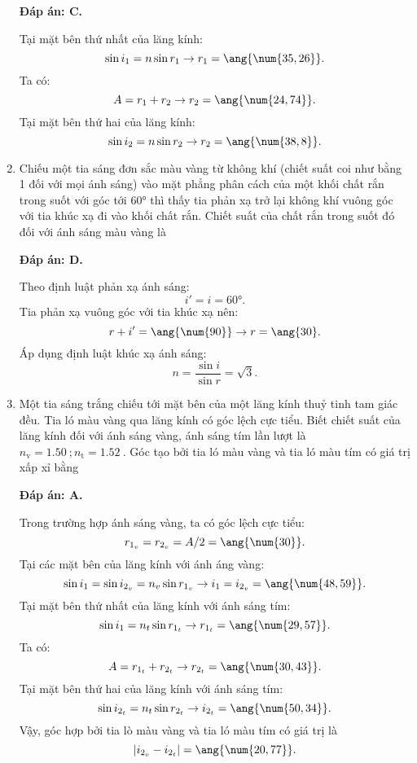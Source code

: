\begin{enumerate}[label=\bfseries Câu \arabic*:]
	\loigiai
	{		\textbf{Đáp án: C.}
		
Tại mặt bên thứ nhất của lăng kính:
$$
	\sin i_{1} = n \sin r_{1} \rightarrow r_{1} = \ang{\num{35,26}}.
$$
Ta có:
$$
	A = r_{1} + r_{2} \rightarrow r_{2} = \ang{\num{24,74}}.
$$
Tại mặt bên thứ hai của lăng kính:
$$
	\sin i_{2} = n \sin r_{2} \rightarrow r_{2} = \ang{\num{38,8}}.
$$
	}
	
	\item {} 
		\cauhoi
	{Chiếu một tia sáng đơn sắc màu vàng từ không khí (chiết suất coi như bằng 1 đối với mọi ánh sáng) vào mặt phẳng phân cách của một khối chất rắn trong suốt với góc tới $\ang{60}$ thì thấy tia phản xạ trở lại không khí vuông góc với tia khúc xạ đi vào khối chất rắn. Chiết suất của chất rắn trong suốt đó đối với ánh sáng màu vàng là
	}
	
	\loigiai
	{		\textbf{Đáp án: D.}
		

Theo định luật phản xạ ánh sáng:
$$
	i' = i = \ang{60}.
$$
Tia phản xạ vuông góc với tia khúc xạ nên: 
$$
	r + i' = \ang{\num{90}} \rightarrow r = \ang{30}.
$$
Áp dụng định luật khúc xạ ánh sáng:
$$
	n = \dfrac{\sin i}{\sin r} = \sqrt{3}.
$$
	}
	
	\item {}
		\cauhoi
	{Một tia sáng trắng chiếu tới mặt bên của một lăng kính thuỷ tinh tam giác đều. Tia ló màu vàng qua lăng kính có góc lệch cực tiểu. Biết chiết suất của lăng kính đối với ánh sáng vàng, ánh sáng tím lần lượt là $n_\text{v} = \SI{1.50}{}; n_\text{t}=\SI{1.52}{}$. Góc tạo bởi tia ló màu vàng và tia ló màu tím có giá trị xấp xỉ bằng
	}
	
	\loigiai
	{		\textbf{Đáp án: A.}
		
Trong trường hợp ánh sáng vàng, ta có góc lệch cực tiểu:
$$
	r_{1_v} = r_{2_v} = A/2 = \ang{\num{30}}.
$$
Tại các mặt bên của lăng kính với ánh áng vàng:
$$
	\sin i_{1} = \sin i_{2_v} = n_{v} \sin r_{1_v} \rightarrow i_{1} = i_{2_v} = \ang{\num{48,59}}.
$$
Tại mặt bên thứ nhất của lăng kính với ánh sáng tím:
$$
	\sin i_{1} = n_{t} \sin r_{1_t} \rightarrow r_{1_t} = \ang{\num{29,57}}.
$$
Ta có:
$$
	A = r_{1_t} + r_{2_t} \rightarrow r_{2_t} = \ang{\num{30,43}}.
$$
Tại mặt bên thứ hai của lăng kính với ánh sáng tím:
$$
	\sin i_{2_t} = n_{t} \sin r_{2_t} \rightarrow i_{2_t} = \ang{\num{50,34}}.
$$
Vậy, góc hợp bởi tia lò màu vàng và tia ló màu tím có giá trị là
$$
	| i_{2_v} - i_{2_t} | = \ang{\num{20,77}}.
$$
		
}
\end{enumerate}
